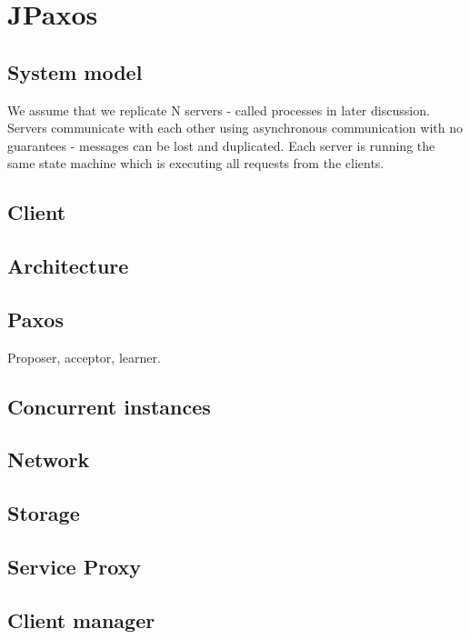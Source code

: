 
\chapter{JPaxos}

\section{System model}

We assume that we replicate N servers - called processes in later discussion.
Servers communicate with each other using asynchronous communication with no
guarantees - messages can be lost and duplicated. Each server is running the
same state machine which is executing all requests from the clients.

\section{Client}

\section{Architecture}

\section{Paxos}
Proposer, acceptor, learner.

\section{Concurrent instances}

\section{Network}
\label{network}

\section{Storage}

\section{Service Proxy}
\label{sec:service-proxy}

\section{Client manager}
\label{sec:client-manager}


